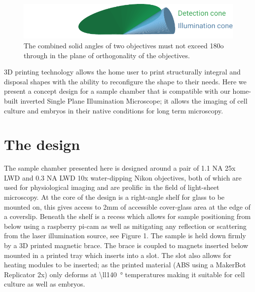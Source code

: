 \begin{figure}
    \centering
    \includegraphics{./solid_angles}
    \caption{The combined solid angles of two objectives must not exceed 180o through in the plane of orthogonality of the objectives.}
    \label{fig:solid_angles}
\end{figure}

3D printing technology allows the home user to print structurally integral and disposal shapes with the ability to reconfigure the shape to their needs.
Here we present a concept design for a sample chamber that is compatible with our home-built inverted Single Plane Illumination Microscope; it allows the imaging of cell culture and embryos in their native conditions for long term microscopy.


\section{The design}
The sample chamber presented here is designed around a pair of 1.1 NA 25x LWD and 0.3 NA LWD 10x water-dipping Nikon objectives, both of which are used for physiological imaging and are prolific in the field of light-sheet microscopy.
At the core of the design is a right-angle shelf for glass to be mounted on, this gives access to 2mm of accessible cover-glass area at the edge of a coverslip.
Beneath the shelf is a recess which allows for sample positioning from below using a raspberry pi-cam as well as mitigating any reflection or scattering from the laser illumination source, see Figure 1.
The sample is held down firmly by a 3D printed magnetic brace.
The brace is coupled to magnets inserted below mounted in a printed tray which inserts into a slot.
The slot also allows for heating modules to be inserted; as the printed material (ABS using a MakerBot Replicator 2x) only deforms at \SI{\ll140}{\degree} temperatures making it suitable for cell culture as well as embryos.

